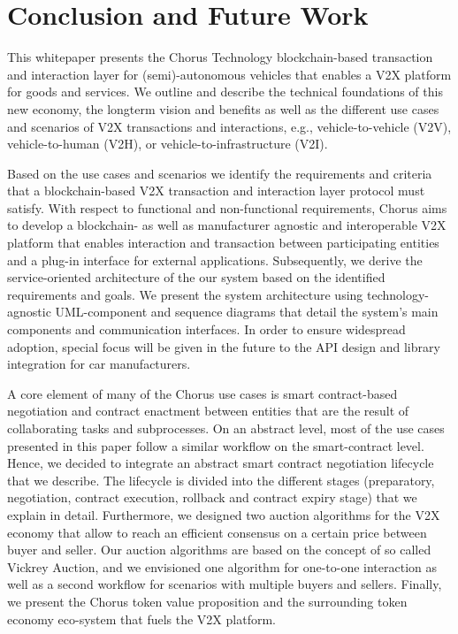 \documentclass{llncs}
\begin{document}
{		
	

	\section{Conclusion and Future Work}
		\label{s:section-8}	

		This whitepaper presents the Chorus Technology blockchain-based transaction and interaction layer for (semi)-autonomous vehicles that enables a V2X platform for goods and services. We outline and describe the technical foundations of this new economy, the longterm vision and benefits as well as the different use cases and scenarios of V2X transactions and interactions, e.g., vehicle-to-vehicle (V2V), vehicle-to-human (V2H), or vehicle-to-infrastructure (V2I).
		
		Based on the use cases and scenarios we identify the requirements and criteria that a blockchain-based V2X transaction and interaction layer protocol must satisfy. With respect to functional and non-functional requirements, Chorus aims to develop a blockchain- as well as manufacturer agnostic and interoperable V2X platform that enables interaction and transaction between participating entities and a plug-in interface for external applications.
		Subsequently, we derive the service-oriented architecture of the our system based on the identified requirements and goals. We present the system architecture using technology-agnostic UML-component and sequence diagrams that detail the system’s main components and communication interfaces. In order to ensure widespread adoption, special focus will be given in the future to the API design and library integration for car manufacturers.
		
		A core element of many of the Chorus use cases is smart contract-based negotiation and contract enactment between
		entities that are the result of collaborating tasks and subprocesses. On an abstract level, most of the use cases presented in this paper follow a similar workflow on the smart-contract level. Hence, we decided to integrate an abstract smart contract negotiation lifecycle that we describe. The lifecycle is divided into the different stages (preparatory, negotiation, contract execution, rollback and contract expiry stage) that we explain in detail. Furthermore, we designed two auction algorithms for the V2X economy that allow to reach an efficient consensus on a certain price between buyer and seller. Our auction algorithms are based on the concept of so called Vickrey Auction, and we envisioned one algorithm for one-to-one interaction as well as a second workflow for scenarios with multiple buyers and sellers. Finally, we present the Chorus token value proposition and the surrounding token economy eco-system that fuels the V2X platform.
		
}
\end{document}
